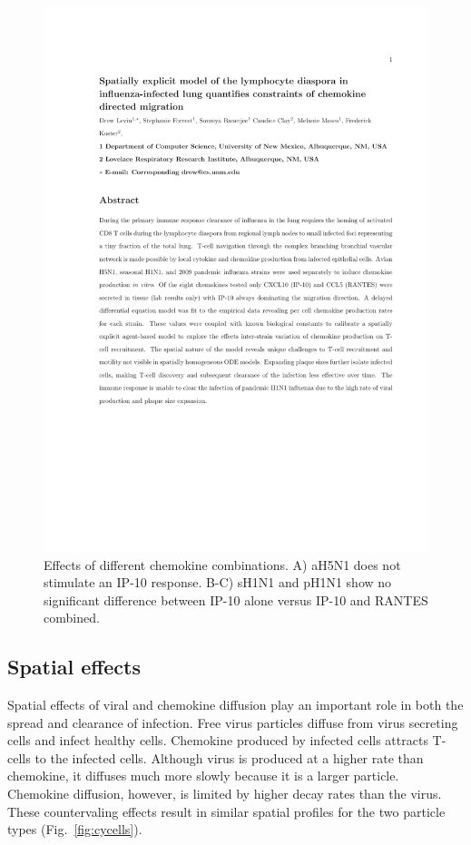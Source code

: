 \documentclass[10pt]{article}
\begin{document}
\begin{figure}[ht!]
\begin{center}
	\includegraphics[width=\textwidth]{chemokine}
	\caption{Effects of different chemokine combinations.  A) aH5N1 does not stimulate an IP-10 response.  B-C) sH1N1 and pH1N1 show no significant difference between IP-10 alone versus IP-10 and RANTES combined.}
	\label{fig:chemokine}
\end{center}
\end{figure}



\subsection*{Spatial effects}

Spatial effects of viral and chemokine diffusion play an important role in both the spread and clearance of infection.  Free virus particles diffuse from virus secreting cells and infect healthy cells.  Chemokine produced by infected cells attracts T-cells to the infected cells.  Although virus is produced at a higher rate than chemokine, it diffuses much more slowly because it is a larger particle.  Chemokine diffusion, however, is limited by higher decay rates than the virus.  These countervaling effects result in similar spatial profiles for the two particle types (Fig.~\ref{fig:cycells}).
\end{document}
